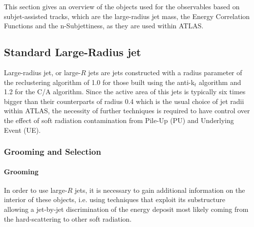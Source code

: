 This section gives an overview of the objects used for the observables based on subjet-assisted tracks, which are the large-radius jet mass, the Energy Correlation Functions and the n-Subjettiness, as they are used within ATLAS.

\subsection{Standard Large-Radius jet}




Large-radius jet, or large-$R$ jets are jets constructed with a radius parameter of the reclustering algorithm of 1.0 for those built using the anti-k$_t$ algorithm and 1.2 for the C/A algorithm.
Since the active area of this jets is typically six times bigger than their counterparts of radius 0.4 which is the usual choice of jet radii within ATLAS, the necessity of further techniques is required to have control over the effect of soft radiation contamination from Pile-Up (PU) and Underlying Event (UE).

\subsubsection{Grooming and Selection}

\paragraph{Grooming}
In order to use large-$R$ jets, it is necessary to gain additional information on the interior of these objects, i.e. using techniques that exploit its substructure allowing a jet-by-jet discrimination of the energy deposit most likely coming from the hard-scattering to other soft radiation.

